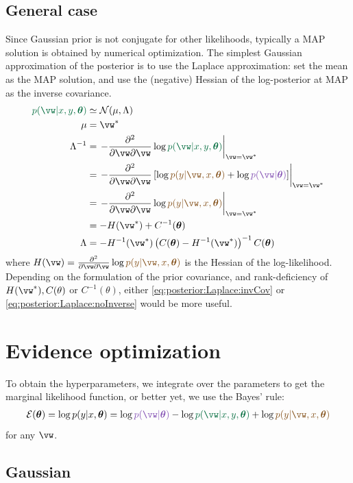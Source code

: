 \documentclass{article}
\newcounter{ct}
\newcommand{\inv}{^{-1}}
\newcommand{\Gaussian}{\ensuremath{\mathcal{N}}} %
\newcommand{\weight}{\vw}
\newcommand{\hyp}{\bm{\theta}}
\newcommand{\likelihood}{\ensuremath{\textcolor{goldenbrown}{p(y|\weight,x,\hyp)}}}
\newcommand{\prior}{\ensuremath{\textcolor{amethyst}{p(\weight|\hyp)}}}
\newcommand{\posterior}{\textcolor{cadmiumgreen}{p(\weight|x,y,\hyp)}}
\begin{document}
\subsection{General case}
Since Gaussian prior is not conjugate for other likelihoods, typically a MAP solution is obtained by numerical optimization.
The simplest Gaussian approximation of the posterior is to use the Laplace approximation: set the mean as the MAP solution, and use the (negative) Hessian of the log-posterior at MAP as the inverse covariance.
\begin{align}
    \posterior &\simeq \Gaussian(\mu, \Lambda)
    \label{eq:posterior:Laplace}
    \\
    \mu &= \weight^\ast
    \\
    \Lambda\inv &= 
	\left.
	-\frac{\partial^2}{\partial \weight \partial \weight}
	\log \posterior \right\vert_{\weight = \weight^\ast}
	\\
	&=
	\left.
	-\frac{\partial^2}{\partial \weight \partial \weight}
	\left[ \log\likelihood + \log\prior \right]
	\right\vert_{\weight = \weight^\ast}
	\\
	&=
	\left.
	-\frac{\partial^2}{\partial \weight \partial \weight}
	\log\likelihood
	\right\vert_{\weight = \weight^\ast}
	\\
	&=
	- H(\weight^\ast)
	+ C\inv(\hyp)
	\label{eq:posterior:Laplace:invCov}
	\\
    \Lambda &=
	- H\inv(\weight^\ast)
	\left(
	    C(\hyp)
	    - H\inv (\weight^\ast)
	\right)\inv
	C(\hyp)
	\label{eq:posterior:Laplace:noInverse}
\end{align}
where 
$ H(\weight) = 
    \frac{\partial^2}{\partial \weight \partial \weight}
    \log\likelihood$ is the Hessian of the log-likelihood.
Depending on the formulation of the prior covariance, and rank-deficiency of $H(\weight^\ast), C(\theta)$ or $C\inv(\theta)$, either \eqref{eq:posterior:Laplace:invCov} or \eqref{eq:posterior:Laplace:noInverse} would be more useful.

\section{Evidence optimization}
To obtain the hyperparameters, we integrate over the parameters to get the marginal likelihood function, or better yet, we use the Bayes' rule:
\begin{align}
    \mathcal{E}(\hyp) = \log p(y|x,\hyp)
	= \log\prior - \log\posterior + \log\likelihood
\end{align}
for any $\weight$.

\subsection{Gaussian}
\end{document}
